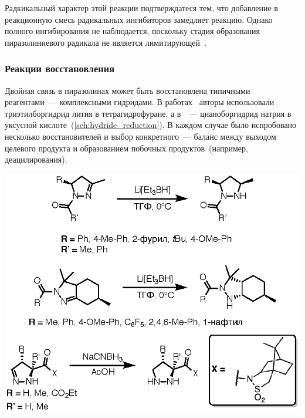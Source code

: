 Радкикальный характер этой реакции подтверждатеся тем, что добавление в реакционную смесь радикальных ингибиторов замедляет реакцию.
Однако полного ингибирования не наблюдается, поскольку стадия образования пиразолиниевого радикала не является лимитирующей~\cite{Traven2016}.



\subsubsection{Реакции восстановления}
Двойная связь  в пиразолинах может быть восстановлена типичными реагентами~--- комплексными гидридами. В работах~\cite{Jakob2010, DeLosSantos2008a} авторы использовали триэтилборгидрид лития в тетрагидрофуране, а в~\cite{Mish1997a}~--- цианоборгидрид натрия в уксусной кислоте~(\ref{sch:hydride_reduction}).
В каждом случае было испробовано несколько восстановителей и выбор конкретного~--- баланс между выходом целевого продукта и образованием побочных продуктов~(например, деацилирования).

\begin{scheme}[h!]
    \centering
    \includegraphics{sections/literature/img/hydride_reduction.eps}
    \caption{}
    \label{sch:hydride_reduction}
\end{scheme}

